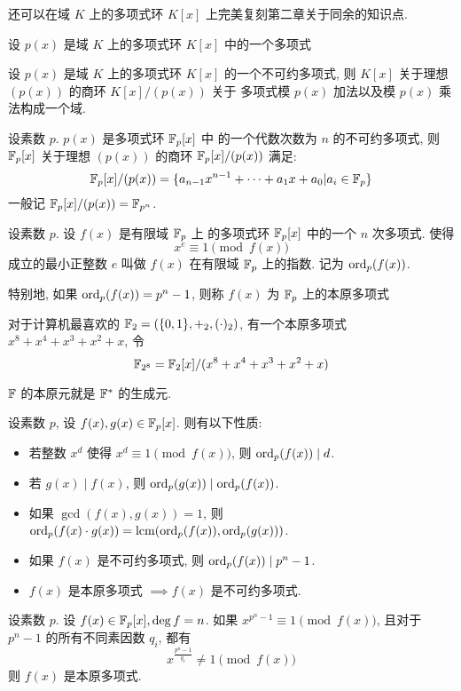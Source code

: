 还可以在域 \(K\) 上的多项式环 \(K[x]\) 上完美复刻第二章关于同余的知识点.

\begin{definition}[多项式环的商环]
    设 \(p(x)\) 是域 \(K\) 上的多项式环 \(K[x]\) 中的一个多项式
\end{definition}

\begin{theorem}
    设 \(p(x)\) 是域 \(K\) 上的多项式环 \(K[x]\) 的一个不可约多项式, 
    则 \(K[x]\) 关于理想 \((p(x))\) 的商环 \(K[x]/(p(x))\) 关于
    多项式模 \(p(x)\) 加法以及模 \(p(x)\) 乘法构成一个域.
\end{theorem}
    
\begin{theorem}[有限域构造]
    设素数 \(p\). \(p(x)\) 是多项式环 \(\mathbb{F}_p[x]\) 中
    的一个代数次数为 \(n\) 的不可约多项式, 则 \(\mathbb{F}_p[x]\)
    关于理想 \((p(x))\) 的商环 \(\mathbb{F}_p[x]/(p(x))\) 满足:
    \[\mathbb{F}_p[x]/(p(x)) = \{a_{n-1}x^{n-1} + \cdots + a_1 x + a_0|a_i \in \mathbb{F}_p\}\]
    一般记 \(\mathbb{F}_p[x]/(p(x)) = \mathbb{F}_{p^n}\).
\end{theorem}

\begin{definition}[本原多项式]
    设素数 \(p\). 设 \(f(x)\) 是有限域 \(\mathbb{F}_p\) 上
    的多项式环 \(\mathbb{F}_p[x]\) 中的一个 \(n\) 次多项式. 使得
    \[x^e \equiv 1 \pmod{f(x)}\]
    成立的最小正整数 \(e\) 叫做 \(f(x)\) 在有限域 \(\mathbb{F}_p\)
    上的指数. 记为 \(\mathrm{ord}_{p}(f(x))\).

    特别地, 如果 \(\mathrm{ord}_{p}(f(x)) = p^n - 1\), 则称 \(f(x)\)
    为 \(\mathbb{F}_p\) 上的本原多项式
\end{definition}

\begin{example}
    对于计算机最喜欢的 \(\mathbb{F}_2 = (\{0,1\},+_2, (\cdot)_2)\),
    有一个本原多项式 \(x^8+x^4+x^3+x^2+x\), 令
    \[\mathbb{F}_{2^8} = \mathbb{F}_2[x]/(x^8+x^4+x^3+x^2+x)\]
\end{example}

\(\mathbb{F}\) 的本原元就是 \(\mathbb{F}^*\) 的生成元.

\begin{theorem}
    设素数 \(p\), 设 \(f(x),g(x)\in \mathbb{F}_p[x]\). 则有以下性质:
    \begin{itemize}
        \item 若整数 \(x^d\) 使得 \(x^d \equiv 1 \pmod{f(x)}\), 则 \(\mathrm{ord}_{p}(f(x)) \mid d\).
        \item 若 \(g(x) \mid f(x)\), 则 \(\mathrm{ord}_{p}(g(x)) \mid \mathrm{ord}_{p}(f(x))\).
        \item 如果 \(\gcd(f(x),g(x)) = 1\), 则 \(\mathrm{ord}_{p}(f(x)\cdot g(x)) = \mathrm{lcm}(\mathrm{ord}_{p}(f(x)), \mathrm{ord}_{p}(g(x)))\).
        \item 如果 \(f(x)\) 是不可约多项式, 则 \(\mathrm{ord}_{p}(f(x)) \mid p^n - 1\).
        \item \(f(x)\) 是本原多项式 \(\implies f(x)\) 是不可约多项式.
    \end{itemize}
\end{theorem}

\begin{theorem}
    设素数 \(p\). 设 \(f(x) \in \mathbb{F}_p[x], \deg f = n\).
    如果 \(x^{p^n - 1} \equiv 1 \pmod{f(x)}\), 且对于
    \(p^n - 1\) 的所有不同素因数 \(q_i\), 都有
    \[x^{\frac{p^n - 1}{q_i}} \ne 1 \pmod{f(x)}\]
    则 \(f(x)\) 是本原多项式.
\end{theorem}
